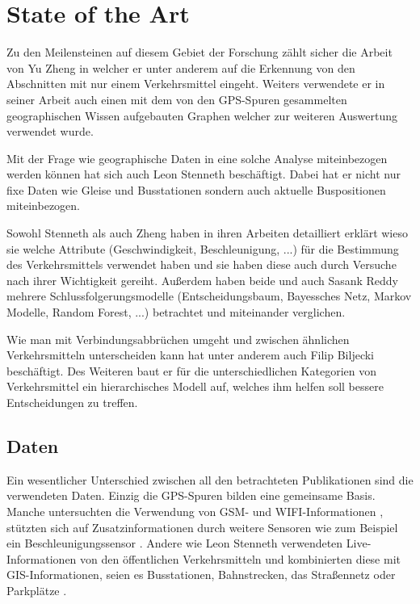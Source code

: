 \chapter{State of the Art}
Zu den Meilensteinen auf diesem Gebiet der Forschung zählt sicher die Arbeit von Yu Zheng in welcher er unter anderem auf die Erkennung von den Abschnitten mit nur einem Verkehrsmittel eingeht. Weiters verwendete er in seiner Arbeit auch einen mit dem von den GPS-Spuren gesammelten geographischen Wissen aufgebauten Graphen welcher zur weiteren Auswertung verwendet wurde.\cite{zheng_understanding_2010, zheng_understanding_2008, zheng_learning_2008}

Mit der Frage wie geographische Daten in eine solche Analyse miteinbezogen werden können hat sich auch Leon Stenneth beschäftigt. Dabei hat er nicht nur fixe Daten wie Gleise und Busstationen sondern auch aktuelle Buspositionen miteinbezogen.

Sowohl Stenneth als auch Zheng haben in ihren Arbeiten detailliert erklärt wieso sie welche Attribute (Geschwindigkeit, Beschleunigung, ...) für die Bestimmung des Verkehrsmittels verwendet haben und sie haben diese auch durch Versuche nach ihrer Wichtigkeit gereiht. Außerdem haben beide und auch Sasank Reddy \cite{reddy_determining_2008} mehrere Schlussfolgerungsmodelle (Entscheidungsbaum, Bayessches Netz, Markov Modelle, Random Forest, ...) betrachtet und miteinander verglichen. 

Wie man mit Verbindungsabbrüchen umgeht und zwischen ähnlichen Verkehrsmitteln unterscheiden kann hat unter anderem auch Filip Biljecki beschäftigt. Des Weiteren baut er für die unterschiedlichen Kategorien von Verkehrsmittel ein hierarchisches Modell auf, welches ihm helfen soll bessere Entscheidungen zu treffen. \cite{biljecki_transportation_2013}

\clearpage

\section{Daten}
Ein wesentlicher Unterschied zwischen all den betrachteten Publikationen sind die verwendeten Daten. Einzig die GPS-Spuren bilden eine gemeinsame Basis. Manche untersuchten die Verwendung von GSM- und WIFI-Informationen \cite{reddy_using_2010},  stützten sich auf Zusatzinformationen durch weitere Sensoren wie zum Beispiel ein Beschleunigungssensor \cite{reddy_using_2010, nadine_schussler_improving_2011}. Andere wie Leon Stenneth verwendeten Live-Informationen von den öffentlichen Verkehrsmitteln und kombinierten diese mit GIS-Informationen, seien es Busstationen, Bahnstrecken, das Straßennetz oder Parkplätze \cite{stenneth_transportation_2011}.

